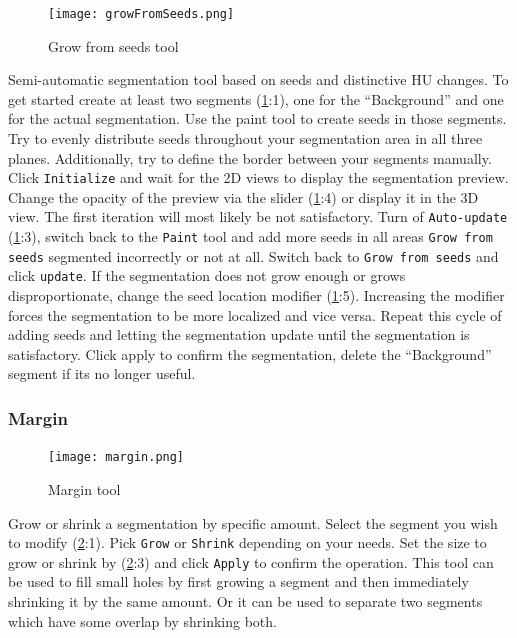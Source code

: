 \begin{figure}[h!]
	\centerline{
		\texttt{[image: growFromSeeds.png]}}
	\caption{Grow from seeds tool}\label{fig:gfs}
\end{figure}
\noindent
Semi-automatic segmentation tool based on seeds and distinctive HU changes.
To get started create at least two segments (\cref{fig:gfs}:1), one for the ``Background'' and one for the actual segmentation.
Use the paint tool to create seeds in those segments.
Try to evenly distribute seeds throughout your segmentation area in all three planes.
Additionally, try to define the border between your segments manually.
Click \texttt{Initialize} and wait for the 2D views to display the segmentation preview.
Change the opacity of the preview via the slider (\cref{fig:gfs}:4) or display it in the 3D view.
The first iteration will most likely be not satisfactory.
Turn of \texttt{Auto-update} (\cref{fig:gfs}:3), switch back to the \texttt{Paint} tool and add more seeds in all areas \texttt{Grow from seeds} segmented incorrectly or not at all.
Switch back to \texttt{Grow from seeds} and click \texttt{update}.
If the segmentation does not grow enough or grows disproportionate, change the seed location modifier (\cref{fig:gfs}:5).
Increasing the modifier forces the segmentation to be more localized and vice versa.
Repeat this cycle of adding seeds and letting the segmentation update until the segmentation is satisfactory.
Click apply to confirm the segmentation, delete the ``Background'' segment if its no longer useful.

\pagebreak

\subsubsection{Margin}
\begin{figure}[h]
	\begin{subfigure}{0.2\textwidth}
		
	\end{subfigure}
\end{figure}


\begin{figure}[h!]
	\centerline{
		\texttt{[image: margin.png]}}
	\caption{Margin tool}\label{fig:margin}
\end{figure}
\noindent
Grow or shrink a segmentation by specific amount.
Select the segment you wish to modify (\cref{fig:margin}:1).
Pick \texttt{Grow} or \texttt{Shrink} depending on your needs.
Set the size to grow or shrink by (\cref{fig:margin}:3) and click \texttt{Apply} to confirm the operation.
This tool can be used to fill small holes by first growing a segment and then immediately shrinking it by the same amount.
Or it can be used to separate two segments which have some overlap by shrinking both.
\pagebreak

